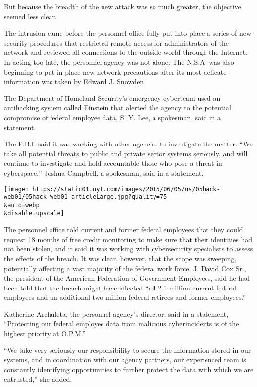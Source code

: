 But because the breadth of the new attack was so much greater, the
objective seemed less clear.

The intrusion came before the personnel office fully put into place a
series of new security procedures that restricted remote access for
administrators of the network and reviewed all connections to the
outside world through the Internet. In acting too late, the personnel
agency was not alone: The N.S.A. was also beginning to put in place new
network precautions after its most delicate information was taken by
Edward J. Snowden.

The Department of Homeland Security's emergency cyberteam used an
antihacking system called Einstein that alerted the agency to the
potential compromise of federal employee data, S. Y. Lee, a spokesman,
said in a statement.

The F.B.I. said it was working with other agencies to investigate the
matter. ``We take all potential threats to public and private sector
systems seriously, and will continue to investigate and hold accountable
those who pose a threat in cyberspace,'' Joshua Campbell, a spokesman,
said in a statement.

\texttt{[image: https://static01.nyt.com/images/2015/06/05/us/05hack-web01/05hack-web01-articleLarge.jpg?quality=75\\\&auto=webp\\\&disable=upscale]}

The personnel office told current and former federal employees that they
could request 18 months of free credit monitoring to make sure that
their identities had not been stolen, and it said it was working with
cybersecurity specialists to assess the effects of the breach. It was
clear, however, that the scope was sweeping, potentially affecting a
vast majority of the federal work force. J. David Cox Sr., the president
of the American Federation of Government Employees, said he had been
told that the breach might have affected ``all 2.1 million current
federal employees and an additional two million federal retirees and
former employees.''

Katherine Archuleta, the personnel agency's director, said in a
statement, ``Protecting our federal employee data from malicious
cyberincidents is of the highest priority at O.P.M.''

``We take very seriously our responsibility to secure the information
stored in our systems, and in coordination with our agency partners, our
experienced team is constantly identifying opportunities to further
protect the data with which we are entrusted,'' she added.


